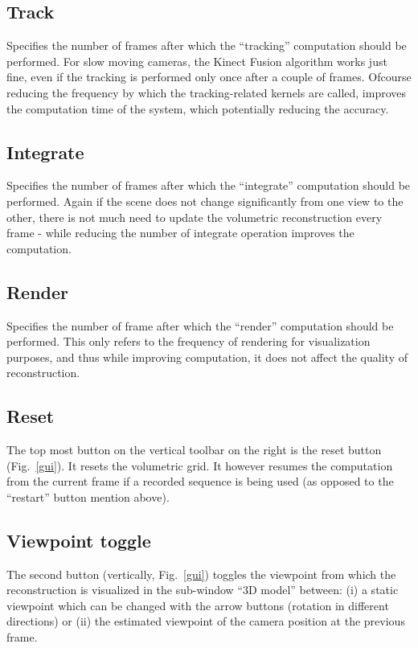 \documentclass[12pt]{article}
\begin{document}
\subsection{Track}
Specifies the number of frames after which the ``tracking'' computation should be performed. For slow moving cameras, the Kinect Fusion algorithm works just fine, even if the tracking is performed only once after a couple of frames. Ofcourse reducing the frequency by which the tracking-related kernels are called, improves the computation time of the system, which potentially reducing the accuracy.

\subsection{Integrate}
Specifies the number of frames after which the ``integrate'' computation should be performed. Again if the scene does not change significantly from one view to the other, there is not much need to update the volumetric reconstruction every frame - while reducing the number of integrate operation improves the computation.

\subsection{Render}
Specifies the number of frame after which the ``render'' computation should be performed. This only refers to the frequency of rendering for visualization purposes, and thus while improving computation, it does not affect the quality of reconstruction.

\subsection{Reset}
The top most button on the vertical toolbar on the right is the reset button (Fig.~\ref{gui}). It resets the volumetric grid. It however resumes the computation from the current frame if a recorded sequence is being used (as opposed to the ``restart'' button mention above).

\subsection{Viewpoint toggle}
\label{sec:vptoggle}
The second button (vertically, Fig.~\ref{gui}) toggles the viewpoint from which the reconstruction is visualized in the sub-window ``3D model'' between: (i) a static viewpoint which can be changed with the arrow buttons (rotation in different directions) or (ii) the estimated viewpoint of the camera position at the previous frame.
\end{document}
